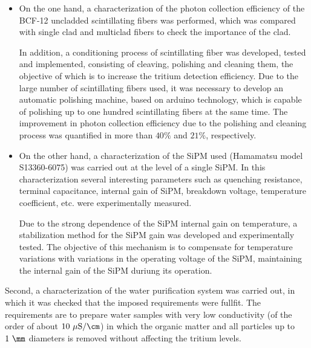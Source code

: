 \begin{itemize}

\item{} On the one hand, a characterization of the photon collection efficiency of the BCF-12 uncladded scintillating fibers was performed, which was compared with single clad and multiclad fibers to check the importance of the clad. 

In addition, a conditioning process of scintillating fiber was developed, tested and implemented, consisting of cleaving, polishing and cleaning them, the objective of which is to increase the tritium detection efficiency. Due to the large number of scintillating fibers used, it was necessary to develop an automatic polishing machine, based on arduino technology, which is capable of polishing up to one hundred scintillating fibers at the same time. The improvement in photon collection efficiency due to the polishing and cleaning process was quantified in more than $40\%$ and $21\%$, respectively. 

\item{} On the other hand, a characterization of the SiPM used (Hamamatsu model S13360-6075) was carried out at the level of a single SiPM. In this characterization several interesting parameters such as quenching resistance, terminal capacitance, internal gain of SiPM, breakdown voltage, temperature coefficient, etc. were experimentally measured. %

Due to the strong dependence of the SiPM internal gain on temperature, a stabilization method for the SiPM gain was developed and experimentally tested. The objective of this mechanism is to compensate for temperature variations with variations in the operating voltage of the SiPM, maintaining the internal gain of the SiPM duriung its operation.

\end{itemize}

Second, a characterization of the water purification system was carried out, in which it was checked that the imposed requirements were fullfit. The requirements are to prepare water samples with very low conductivity (of the order of about $10~\mu\text{S}/\cm$) in which the organic matter and all particles up to $1~\mm$ diameters is removed without affecting the tritium levels.

